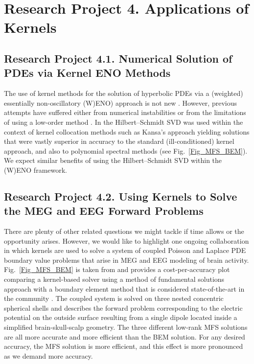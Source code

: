 \documentclass[11pt]{NSFamsart}
\begin{document}
\section*{Research Project 4. Applications of Kernels}
\label{appsec}
\subsection*{Research Project 4.1. Numerical Solution of PDEs via Kernel ENO Methods}  \label{PDEsubsec}
The use of kernel methods for the solution of hyperbolic PDEs via a (weighted) essentially non-oscillatory (W)ENO) approach is not new \citep{CecilEtAl04,IskeSonar96}. However, previous attempts have suffered either from numerical instabilities \citep{CecilEtAl04} or from the limitations of using a low-order method \citep{IskeSonar96}. In \citep{McCourt13} the Hilbert--Schmidt SVD was used within the context of kernel collocation methods such as Kansa's approach \citep{Fas07a} yielding solutions that were vastly superior in accuracy to the standard (ill-conditioned) kernel approach, and also to polynomial spectral methods (see Fig.~\ref{Fig_MFS_BEM}). We expect similar benefits of using the Hilbert--Schmidt SVD within the (W)ENO framework.

\subsection*{Research Project 4.2. Using Kernels to Solve the MEG and EEG Forward Problems} \label{SectMEEG}
There are plenty of other related questions we might tackle if time allows or the opportunity arises. However, we would like to highlight one ongoing collaboration in which kernels are used to solve a system of coupled Poisson and Laplace PDE boundary value problems that arise in MEG and EEG modeling of brain activity. Fig.~\ref{Fig_MFS_BEM} is taken from \citep{AFFGM13} and provides a cost-per-accuracy plot comparing a kernel-based solver using a method of fundamental solutions approach with a boundary element method that is considered state-of-the-art in the community \citep{fieldtrip11}. The coupled system is solved on three nested concentric spherical shells and describes the forward problem corresponding to the electric potential on the outside surface resulting from a single dipole located inside a simplified brain-skull-scalp geometry. The three different low-rank MFS solutions are all more accurate and more efficient than the BEM solution. For any desired accuracy, the MFS solution is more efficient, and this effect is more pronounced as we demand more accuracy.
\end{document}
